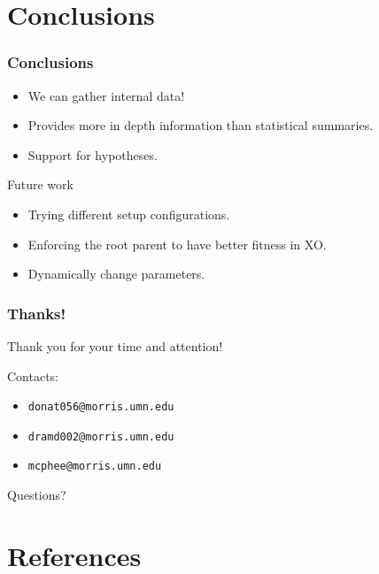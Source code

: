 \documentclass{beamer}
\newcommand{\linespace}{\vskip 0.25cm}
\begin{document}
\section[Conclusions]{Conclusions}

\begin{frame}
\frametitle{Conclusions}

\begin{itemize}
\item We can gather internal data!
\item Provides more in depth information than statistical summaries. 
\item Support for hypotheses.
\end{itemize}
\linespace
\linespace
\linespace
\linespace

Future work
\begin{itemize}
\item Trying different setup configurations.
\item Enforcing the root parent to have better fitness in XO.
\item Dynamically change parameters.
\end{itemize}
\end{frame}

\begin{frame}
	\frametitle{Thanks!}
	
	Thank you for your time and attention!
		
	\linespace
	\linespace
	
	Contacts:  
	\begin{itemize}
		\item \texttt{donat056@morris.umn.edu}
		\item \texttt{dramd002@morris.umn.edu}
		\item \texttt{mcphee@morris.umn.edu}
	\end{itemize}
	
	\linespace
	\linespace
	
	\begin{center}
	{\huge Questions?}
	\end{center}
\end{frame}

\section*{References}
\end{document}
